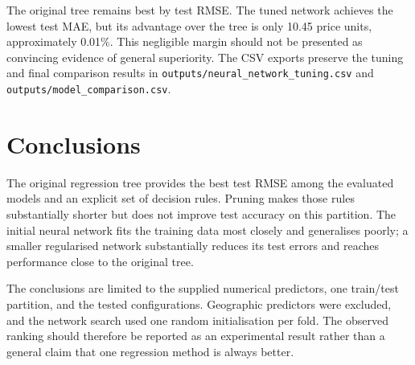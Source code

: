 \documentclass[11pt,a4paper]{article}
\begin{document}
The original tree remains best by test RMSE. The tuned network achieves the lowest test MAE, but its advantage over the tree is only 10.45 price units, approximately 0.01\%. This negligible margin should not be presented as convincing evidence of general superiority. The CSV exports preserve the tuning and final comparison results in \texttt{outputs/neural\_network\_tuning.csv} and \texttt{outputs/model\_comparison.csv}.

\section{Conclusions}
The original regression tree provides the best test RMSE among the evaluated models and an explicit set of decision rules. Pruning makes those rules substantially shorter but does not improve test accuracy on this partition. The initial neural network fits the training data most closely and generalises poorly; a smaller regularised network substantially reduces its test errors and reaches performance close to the original tree.

The conclusions are limited to the supplied numerical predictors, one train/test partition, and the tested configurations. Geographic predictors were excluded, and the network search used one random initialisation per fold. The observed ranking should therefore be reported as an experimental result rather than a general claim that one regression method is always better.

\clearpage
\appendix
\end{document}
